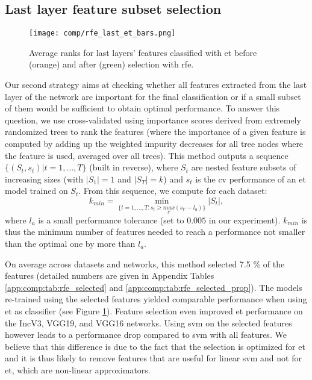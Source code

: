 \subsection{Last layer feature subset selection}
\label{ssec:comp:exp_feat_sel}

\begin{figure}
    \centering
    \texttt{[image: comp/rfe\_last\_et\_bars.png]}
    \caption{Average ranks for last layers' features classified with \acrshort{et} before (orange) and after (green) selection with \acrlong{rfe}.}
    \label{fig:comp:exp_rfe_last_et_cmp}
\end{figure}

Our second strategy aims at checking whether all features extracted from the last layer of the network are important for the final classification or if a small subset of them would be sufficient to obtain optimal performance. To answer this question, we use cross-validated  \parencite{guyon2002gene} using importance scores derived from extremely randomized trees to rank the features (where the importance of a given feature is computed by adding up the weighted impurity decreases for all tree nodes where the feature is used, averaged over all trees). This method outputs a sequence $\{(S_t,s_t)|t=1,\ldots,T\}$ (built in reverse), where $S_t$ are nested feature subsets of increasing sizes (with $|S_1|=1$ and $|S_T|=k$) and $s_t$ is the \acrlong{cv} performance of an \acrshort{et} model trained on $S_t$. From this sequence, we compute for each dataset:
$$k_{min} = \min_{\{t=1,\ldots,T: s_t\geq \underset{t'}{max} (s_{t'}-l_a)\}} |S_t|,$$
where $l_a$ is a small performance tolerance (set to $0.005$ in our experiment). $k_{min}$ is thus the minimum number of features needed to reach a performance not smaller than the optimal one by more than $l_a$.

On average across datasets and networks, this method selected 7.5 \% of the features (detailed numbers are given in Appendix Tables \ref{app:comp:tab:rfe_selected} and
\ref{app:comp:tab:rfe_selected_prop}). The models re-trained using the selected features yielded comparable performance when using \acrshort{et} as classifier (see Figure \ref{fig:comp:exp_rfe_last_et_cmp}). Feature selection even improved \acrshort{et} performance on the IncV3, VGG19, and VGG16 networks. Using \acrshort{svm} on the selected features however leads to a performance drop compared to \acrshort{svm} with all features. We believe that this difference is due to the fact that the selection is optimized for \acrshort{et} and it is thus likely to remove features that are useful for linear \acrshort{svm} and not for \acrshort{et}, which are non-linear approximators.

